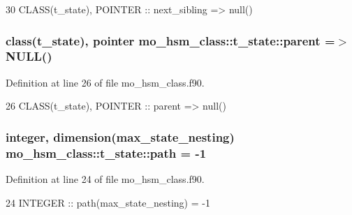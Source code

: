 \begin{DoxyCode}
30     \textcolor{keywordtype}{CLASS}(t\_state), \textcolor{keywordtype}{POINTER}     :: next\_sibling => null()
\end{DoxyCode}
\hypertarget{structmo__hsm__class_1_1t__state_a88cd96170047dcb13c901b0e6757b8b6}{}
\subsubsection[{parent}]{\setlength{\rightskip}{0pt plus 5cm}class({\bf t\+\_\+state}), pointer mo\+\_\+hsm\+\_\+class\+::t\+\_\+state\+::parent =$>$ N\+U\+L\+L()}\label{structmo__hsm__class_1_1t__state_a88cd96170047dcb13c901b0e6757b8b6}


Definition at line 26 of file mo\+\_\+hsm\+\_\+class.\+f90.


\begin{DoxyCode}
26     \textcolor{keywordtype}{CLASS}(t\_state), \textcolor{keywordtype}{POINTER}     :: parent       => null()
\end{DoxyCode}
\hypertarget{structmo__hsm__class_1_1t__state_ab3246c59be74c1498c6eff0aac664ae4}{}
\subsubsection[{path}]{\setlength{\rightskip}{0pt plus 5cm}integer, dimension({\bf max\+\_\+state\+\_\+nesting}) mo\+\_\+hsm\+\_\+class\+::t\+\_\+state\+::path = -\/1}\label{structmo__hsm__class_1_1t__state_ab3246c59be74c1498c6eff0aac664ae4}


Definition at line 24 of file mo\+\_\+hsm\+\_\+class.\+f90.


\begin{DoxyCode}
24     \textcolor{keywordtype}{INTEGER}                     :: path(max\_state\_nesting) = -1
\end{DoxyCode}
\hypertarget{structmo__hsm__class_1_1t__state_a96f33ab989c4e792345834adef8e86cf}{}
